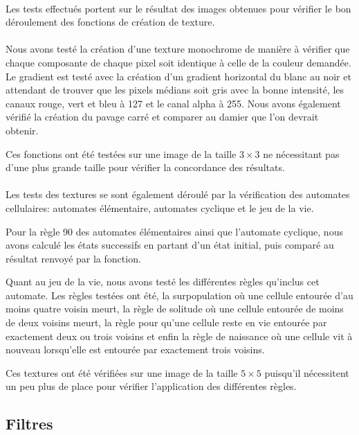 \documentclass[a4paper]{article}
\begin{document}
\paragraph{}
Les tests effectués portent sur le résultat des images obtenues pour vérifier le bon déroulement des fonctions de création de texture.

\paragraph{}
Nous avons testé la création d'une texture monochrome de manière à vérifier que chaque composante de chaque pixel soit identique à celle de la couleur demandée. Le gradient est testé avec la création d'un gradient horizontal du blanc au noir et attendant de trouver que les pixels médians soit gris avec la bonne intensité, les canaux rouge, vert et bleu à 127 et le canal alpha à 255. Nous avons également vérifié la création du pavage carré et comparer au damier que l'on devrait obtenir.

Ces fonctions ont été testées sur une image de la taille $3 \times 3$ ne nécessitant pas d'une plus grande taille pour vérifier la concordance des résultats.

\paragraph{}
Les tests des textures se sont également déroulé par la vérification des automates cellulaires: automates élémentaire, automates cyclique et le jeu de la vie.

Pour la règle 90 des automates élémentaires ainsi que l'automate cyclique, nous avons calculé les états successifs en partant d'un état initial, puis comparé au résultat renvoyé par la fonction.

Quant au jeu de la vie, nous avons testé les différentes règles qu'inclus cet automate. Les règles testées ont été, la surpopulation où une cellule entourée d'au moins quatre voisin meurt, la règle de solitude où une cellule entourée de moins de deux voisins meurt, la règle pour qu'une cellule reste en vie entourée par exactement deux ou trois voisins et enfin la règle de naissance où une cellule vit à nouveau lorsqu'elle est entourée par exactement trois voisins.

Ces textures ont été vérifiées sur une image de la taille $5 \times 5$ puisqu'il nécessitent un peu plus de place pour vérifier l'application des différentes règles.

\subsection{Filtres}
\end{document}
